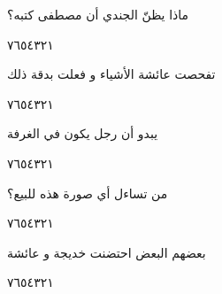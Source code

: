 \documentclass[11pt, a4paper]{article}
\begin{document}
{\vspace{0.5\baselineskip}\begin{flushright}
\textarabic{ماذا يظنّ الجندي أن مصطفى كتبه؟}
\end{flushright}

\begin{center}
        \hfill\textarabic{٧}\hfill\textarabic{٦}\hfill\textarabic{٥}\hfill\textarabic{٤}\hfill\textarabic{٣}\hfill\textarabic{٢}\hfill\textarabic{١}
        \end{center}


\vspace{0.5\baselineskip}\begin{flushright}
\textarabic{تفحصت عائشة الأشياء و فعلت بدقة ذلك}
\end{flushright}

\begin{center}
        \hfill\textarabic{٧}\hfill\textarabic{٦}\hfill\textarabic{٥}\hfill\textarabic{٤}\hfill\textarabic{٣}\hfill\textarabic{٢}\hfill\textarabic{١}
        \end{center}


\vspace{0.5\baselineskip}\begin{flushright}
\textarabic{يبدو أن رجل يكون في الغرفة}
\end{flushright}

\begin{center}
        \hfill\textarabic{٧}\hfill\textarabic{٦}\hfill\textarabic{٥}\hfill\textarabic{٤}\hfill\textarabic{٣}\hfill\textarabic{٢}\hfill\textarabic{١}
        \end{center}


\vspace{0.5\baselineskip}\begin{flushright}
\textarabic{من تساءل أي صورة هذه للبيع؟}
\end{flushright}

\begin{center}
        \hfill\textarabic{٧}\hfill\textarabic{٦}\hfill\textarabic{٥}\hfill\textarabic{٤}\hfill\textarabic{٣}\hfill\textarabic{٢}\hfill\textarabic{١}
        \end{center}


\vspace{0.5\baselineskip}\begin{flushright}
\textarabic{بعضهم البعض احتضنت خديجة و عائشة}
\end{flushright}

\begin{center}
        \hfill\textarabic{٧}\hfill\textarabic{٦}\hfill\textarabic{٥}\hfill\textarabic{٤}\hfill\textarabic{٣}\hfill\textarabic{٢}\hfill\textarabic{١}
        \end{center}


}
\end{document}
